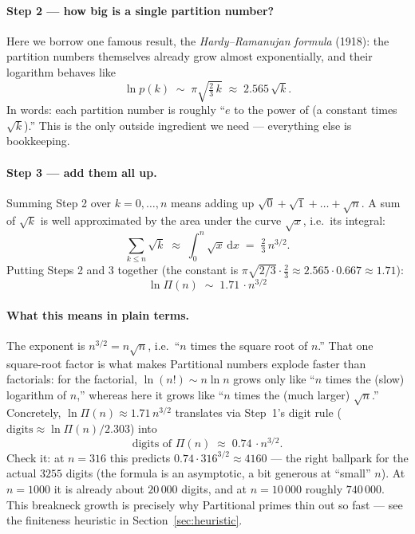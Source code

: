 \documentclass[11pt,a4paper]{article}
\newcommand{\Part}{\Pi}                 %
\begin{document}
\paragraph{Step 2 --- how big is a single partition number?}
Here we borrow one famous result, the \emph{Hardy--Ramanujan formula} (1918): the
partition numbers themselves already grow almost exponentially, and their
logarithm behaves like
\[
  \ln p(k) \;\sim\; \pi\sqrt{\tfrac{2}{3}\,k} \;\approx\; 2.565\,\sqrt{k}.
\]
In words: each partition number is roughly ``$e$ to the power of (a constant
times $\sqrt{k}$).'' This is the only outside ingredient we need --- everything
else is bookkeeping.

\paragraph{Step 3 --- add them all up.}
Summing Step 2 over $k=0,\dots,n$ means adding up $\sqrt{0}+\sqrt{1}+\dots+\sqrt{n}$.
A sum of $\sqrt{k}$ is well approximated by the area under the curve $\sqrt{x}$,
i.e.\ its integral:
\[
  \sum_{k\le n}\sqrt{k} \;\approx\; \int_{0}^{n}\!\sqrt{x}\,\mathrm{d}x
                       \;=\; \tfrac{2}{3}\,n^{3/2}.
\]
Putting Steps 2 and 3 together (the constant is
$\pi\sqrt{2/3}\cdot\tfrac23 \approx 2.565\cdot0.667 \approx 1.71$):
\[
  \boxed{\;\ln \Part(n)\;\sim\; 1.71\,\cdot n^{3/2}\;}
\]

\paragraph{What this means in plain terms.}
The exponent is $n^{3/2}=n\sqrt{n}$, i.e.\ ``$n$ times the square root of $n$.''
That one square-root factor is what makes Partitional numbers explode faster than
factorials: for the factorial, $\ln(n!)\sim n\ln n$ grows only like ``$n$ times
the (slow) logarithm of $n$,'' whereas here it grows like ``$n$ times the (much
larger) $\sqrt{n}$.'' Concretely, $\ln\Part(n)\approx 1.71\,n^{3/2}$ translates
via Step~1's digit rule ($\text{digits}\approx\ln\Part(n)/2.303$) into
\[
  \text{digits of }\Part(n)\;\approx\; 0.74\,\cdot n^{3/2}.
\]
Check it: at $n=316$ this predicts $0.74\cdot316^{3/2}\approx 4160$ --- the right
ballpark for the actual $3255$ digits (the formula is an asymptotic, a bit
generous at ``small'' $n$). At $n=1000$ it is already about $20\,000$ digits, and
at $n=10\,000$ roughly $740\,000$. This breakneck growth is precisely why
Partitional primes thin out so fast --- see the finiteness heuristic in
Section~\ref{sec:heuristic}.
\end{document}
